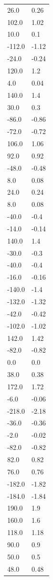\begin{longtable}{ll}
26.0 & 0.26 \\
102.0 & 1.02 \\
10.0 & 0.1 \\
-112.0 & -1.12 \\
-24.0 & -0.24 \\
120.0 & 1.2 \\
4.0 & 0.04 \\
140.0 & 1.4 \\
30.0 & 0.3 \\
-86.0 & -0.86 \\
-72.0 & -0.72 \\
106.0 & 1.06 \\
92.0 & 0.92 \\
-48.0 & -0.48 \\
8.0 & 0.08 \\
24.0 & 0.24 \\
8.0 & 0.08 \\
-40.0 & -0.4 \\
-14.0 & -0.14 \\
140.0 & 1.4 \\
-30.0 & -0.3 \\
-40.0 & -0.4 \\
-16.0 & -0.16 \\
-140.0 & -1.4 \\
-132.0 & -1.32 \\
-42.0 & -0.42 \\
-102.0 & -1.02 \\
142.0 & 1.42 \\
-82.0 & -0.82 \\
0.0 & 0.0 \\
38.0 & 0.38 \\
172.0 & 1.72 \\
-6.0 & -0.06 \\
-218.0 & -2.18 \\
-36.0 & -0.36 \\
-2.0 & -0.02 \\
-82.0 & -0.82 \\
82.0 & 0.82 \\
76.0 & 0.76 \\
-182.0 & -1.82 \\
-184.0 & -1.84 \\
190.0 & 1.9 \\
160.0 & 1.6 \\
118.0 & 1.18 \\
90.0 & 0.9 \\
50.0 & 0.5 \\
48.0 & 0.48 \\

\end{longtable}

